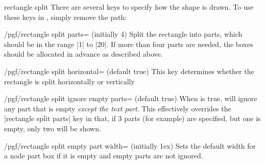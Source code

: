 \begin{shape}{rectangle split}
  There are several \pgfname{} keys to specify how the shape is
  drawn. To use these keys in \tikzname, simply remove the
   path:

\begin{key}{/pgf/rectangle split parts= (initially 4)}
  Split the rectangle into  parts,
  which should be in the range |1| to |20|. If more than four parts
  are needed, the boxes should be allocated in advance as
  described above.

\begin{codeexample}[]
\end{codeexample}
\end{key}

\begin{key}{/pgf/rectangle split horizontal= (default true)}
  This key determines whether the rectangle is split horizontally or vertically
 \end{key}

  \begin{key}{/pgf/rectangle split ignore empty parts= (default true)}
    When  is true, \pgfname{} will ignore any part
    that is empty \emph{except the text part}.
    This effectively overrides the |rectangle split parts| key in that, if
    3 parts (for example) are specified, but one is empty, only
    two will be shown.

\begin{codeexample}[]
\end{codeexample}
  \end{key}
%
	\begin{key}{/pgf/rectangle split empty part width= (initially 1ex)}
    Sets the default width for a node part box if it is empty and
    empty parts are not ignored.
  \end{key}


\end{shape}
